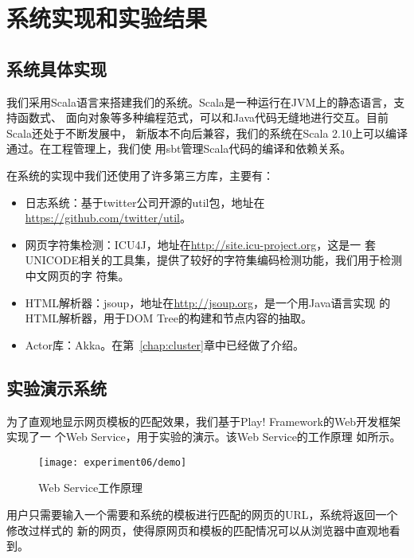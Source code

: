
\chapter{系统实现和实验结果}
\label{chap:experiment}

\section{系统具体实现}
\label{sec:implementation}
我们采用Scala语言来搭建我们的系统。Scala是一种运行在JVM上的静态语言，支持函数式、
面向对象等多种编程范式，可以和Java代码无缝地进行交互。目前Scala还处于不断发展中，
新版本不向后兼容，我们的系统在Scala 2.10上可以编译通过。在工程管理上，我们使
用sbt管理Scala代码的编译和依赖关系。

在系统的实现中我们还使用了许多第三方库，主要有：
\begin{itemize}
\item 日志系统：基于twitter公司开源的util包，地址在
  \url{https://github.com/twitter/util}。
\item 网页字符集检测：ICU4J，地址在\url{http://site.icu-project.org}，这是一
  套UNICODE相关的工具集，提供了较好的字符集编码检测功能，我们用于检测中文网页的字
  符集。
\item HTML解析器：jsoup，地址在\url{http://jsoup.org}，是一个用Java语言实现
  的HTML解析器，用于DOM Tree的构建和节点内容的抽取。
\item Actor库：Akka。在第~\ref{chap:cluster}章中已经做了介绍。
\end{itemize}
\section{实验演示系统}
\label{sec:demo}
为了直观地显示网页模板的匹配效果，我们基于Play! Framework的Web开发框架实现了一
个Web Service，用于实验的演示。该Web Service的工作原理
如所示。
\begin{figure}
  \centering
  \texttt{[image: experiment06/demo]}
  \caption{Web Service工作原理}
  \label{experiment:fig:demo}
\end{figure}

用户只需要输入一个需要和系统的模板进行匹配的网页的URL，系统将返回一个修改过样式的
新的网页，使得原网页和模板的匹配情况可以从浏览器中直观地看到。


